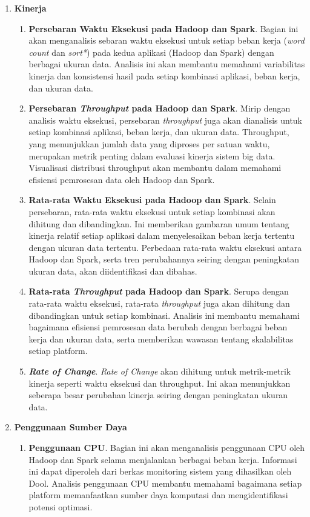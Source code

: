 \begin{enumerate}	
	\item \textbf{Kinerja}
	\begin{enumerate}
		\item \textbf{Persebaran Waktu Eksekusi pada Hadoop dan Spark}. Bagian ini akan menganalisis sebaran waktu eksekusi untuk setiap beban kerja (\textit{word count} dan \textit{sort*}) pada kedua aplikasi (Hadoop dan Spark) dengan berbagai ukuran data. Analisis ini akan membantu memahami variabilitas kinerja dan konsistensi hasil pada setiap kombinasi aplikasi, beban kerja, dan ukuran data.
		\item \textbf{Persebaran \textit{Throughput} pada Hadoop dan Spark}. Mirip dengan analisis waktu eksekusi, persebaran \textit{throughput} juga akan dianalisis untuk setiap kombinasi aplikasi, beban kerja, dan ukuran data. Throughput, yang menunjukkan jumlah data yang diproses per satuan waktu,  merupakan metrik penting dalam evaluasi kinerja sistem big data.  Visualisasi distribusi throughput akan membantu dalam memahami efisiensi pemrosesan data oleh Hadoop dan Spark.
		\item \textbf{Rata-rata Waktu Eksekusi pada Hadoop dan Spark}. Selain persebaran, rata-rata waktu eksekusi untuk setiap kombinasi akan dihitung dan dibandingkan.  Ini memberikan gambaran umum tentang kinerja relatif setiap aplikasi dalam menyelesaikan beban kerja tertentu dengan ukuran data tertentu. Perbedaan rata-rata waktu eksekusi antara Hadoop dan Spark, serta tren perubahannya seiring dengan peningkatan ukuran data, akan diidentifikasi dan dibahas.
		\item \textbf{Rata-rata \textit{Throughput} pada Hadoop dan Spark}. Serupa dengan rata-rata waktu eksekusi, rata-rata \textit{throughput} juga akan dihitung dan dibandingkan untuk setiap kombinasi. Analisis ini membantu memahami bagaimana efisiensi pemrosesan data berubah dengan berbagai beban kerja dan ukuran data, serta memberikan wawasan tentang skalabilitas setiap platform.
		\item \textbf{\textit{Rate of Change}}. \textit{Rate of Change} akan dihitung untuk metrik-metrik kinerja seperti waktu eksekusi dan throughput. Ini akan menunjukkan seberapa besar perubahan kinerja seiring dengan peningkatan ukuran data.  
	\end{enumerate}
	\item \textbf{Penggunaan Sumber Daya}
	\begin{enumerate}
	\item \textbf{Penggunaan CPU}. Bagian ini akan menganalisis penggunaan CPU oleh Hadoop dan Spark selama menjalankan berbagai beban kerja.  Informasi ini dapat diperoleh dari berkas monitoring sistem yang dihasilkan oleh Dool.  Analisis penggunaan CPU membantu memahami bagaimana setiap platform memanfaatkan sumber daya komputasi dan mengidentifikasi potensi optimasi.

\end{enumerate}
\end{enumerate}
